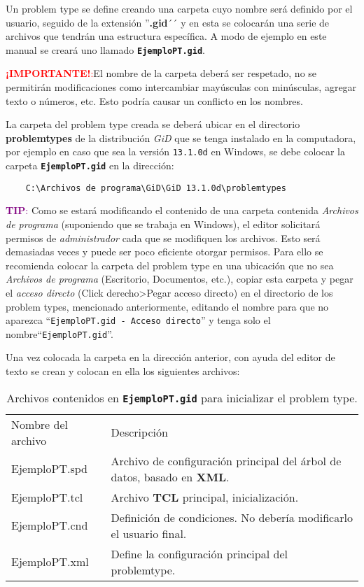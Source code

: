 \documentclass[10pt, a4paper, twocolumn]{article} %
\begin{document}
Un problem type se define creando una carpeta cuyo nombre será definido por el usuario, seguido de la extensión ''\textbf{.gid}´´ y en esta se colocarán una serie de archivos que tendrán una estructura específica. A modo de ejemplo en este manual se creará uno llamado \textbf{\texttt{EjemploPT.gid}}.

\textcolor{red}{\textbf{¡IMPORTANTE!}:}El nombre de la carpeta deberá ser respetado, no se permitirán modificaciones como intercambiar mayúsculas con minúsculas, agregar texto o números, etc. Esto podría causar un conflicto en los nombres.

La carpeta del problem type creada se deberá ubicar en el directorio \textbf{problemtypes} de la distribución \textit{GiD} que se tenga instalado en la computadora, por ejemplo en caso que sea la versión \texttt{13.1.0d} en Windows, se debe colocar la carpeta \textbf{\texttt{EjemploPT.gid}} en la dirección:

\begin{verbatim}
	C:\Archivos de programa\GiD\GiD 13.1.0d\problemtypes
\end{verbatim}

\textcolor{purple}{\textbf{TIP}:} Como se estará modificando el contenido de una carpeta contenida \textit{Archivos de programa} (suponiendo que se trabaja en Windows), el editor solicitará permisos de \textit{administrador} cada que se modifiquen los archivos. Esto será demasiadas veces y puede ser poco eficiente otorgar permisos. Para ello se recomienda colocar la carpeta del problem type en una ubicación que no sea \textit{Archivos de programa} (Escritorio, Documentos, etc.), copiar esta carpeta y pegar el \textit{acceso directo} (Click derecho>Pegar acceso directo) en el directorio de los problem types, mencionado anteriormente, editando el nombre para que no aparezca ``\texttt{EjemploPT.gid - Acceso directo}'' y tenga solo el nombre``\texttt{EjemploPT.gid}''.

Una vez colocada la carpeta en la dirección anterior, con ayuda del editor de texto se crean y colocan en ella los siguientes archivos:

\begin{table}[hbtp!] \label{tab:estructuraArchivos}
	\begin{tabular}{l m{4.5cm}}
		\rowcolor{BlueGiD!60} Nombre del archivo & Descripción\\
		\rowcolor{BlueGiD!20} EjemploPT.spd & Archivo de configuración principal del árbol de datos, basado en \textbf{XML}.\\
		EjemploPT.tcl & Archivo \textbf{TCL} principal, inicialización.\\
		\rowcolor{BlueGiD!20} EjemploPT.cnd & Definición de condiciones. No debería modificarlo el usuario final.\\
		EjemploPT.xml & Define la configuración principal del problemtype.\\
	\end{tabular}
	\caption{Archivos contenidos en \textbf{\texttt{EjemploPT.gid}} para inicializar el problem type.}
\end{table}
\end{document}
